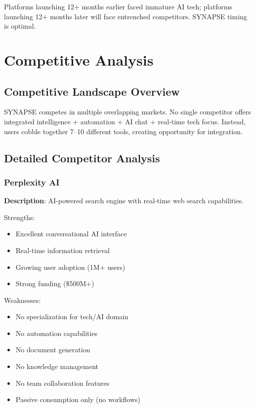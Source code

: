 \documentclass{report}
\begin{document}
Platforms launching 12+ months earlier faced immature AI tech; platforms launching 12+ months later will face entrenched competitors. SYNAPSE timing is optimal.

\newpage

\chapter{Competitive Analysis}

\section{Competitive Landscape Overview}

SYNAPSE competes in multiple overlapping markets. No single competitor offers integrated intelligence + automation + AI chat + real-time tech focus. Instead, users cobble together 7--10 different tools, creating opportunity for integration.

\section{Detailed Competitor Analysis}

\subsection{Perplexity AI}

\textbf{Description}: AI-powered search engine with real-time web search capabilities.

Strengths:
\begin{itemize}
    \item Excellent conversational AI interface
    \item Real-time information retrieval
    \item Growing user adoption (1M+ users)
    \item Strong funding (\$500M+)
\end{itemize}

Weaknesses:
\begin{itemize}
    \item No specialization for tech/AI domain
    \item No automation capabilities
    \item No document generation
    \item No knowledge management
    \item No team collaboration features
    \item Passive consumption only (no workflows)
\end{itemize}
\end{document}
